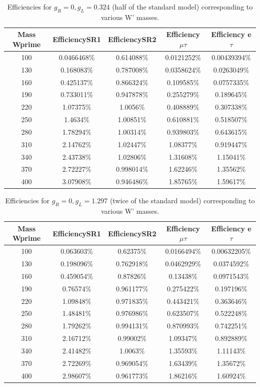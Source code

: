    \begin{table}[htb]
 	\centering
  	\begin{tabular}{|ccccc|}
  		\hline 
  		Mass Wprime  & EfficiencySR1  & EfficiencySR2 & Efficiency $\mu$$\tau$ & Efficiency e $\tau$ \\
                \hline 
100& 0.0466468\%& 0.614088\%& 0.0121252\%& 0.00439394\%\\
130& 0.168083\%& 0.787008\%& 0.0358624\%& 0.0263049\%\\
160& 0.425137\%& 0.866324\%& 0.109585\%& 0.0757335\%\\
190& 0.733011\%& 0.947878\%& 0.255279\%& 0.189645\%\\
220& 1.07375\%& 1.0056\%& 0.408889\%& 0.307338\%\\
250& 1.4634\%& 1.00851\%& 0.610881\%& 0.518507\%\\
280& 1.78294\%& 1.00314\%& 0.939803\%& 0.643615\%\\
310& 2.14762\%& 1.02447\%& 1.08377\%& 0.919447\%\\
340& 2.43738\%& 1.02806\%& 1.31608\%& 1.15041\%\\
370& 2.72227\%& 0.998014\%& 1.62246\%& 1.35562\%\\
400& 3.07908\%& 0.946486\%& 1.85765\%& 1.59617\%\\
  	
  	\hline
  	\end{tabular}
  	\caption{Efficiencies for $ g_R=0 , g_L=0.324 $ (half of the standard model) corresponding to various W' masses. \label{eff-half} }
  \end{table}
 

 \begin{table}[htb]
 	\centering
  	\begin{tabular}{|ccccc|}
  		\hline 
  		Mass Wprime  & EfficiencySR1  & EfficiencySR2 & Efficiency $\mu$$\tau$ & Efficiency e $\tau$ \\
 \hline 
100& 0.063603\%& 0.62375\%& 0.0166494\%& 0.00632205\%\\
130& 0.198096\%& 0.762918\%& 0.0462929\%& 0.0374592\%\\
160& 0.459054\%& 0.87826\%& 0.13438\%& 0.0971543\%\\
190& 0.76574\%& 0.961177\%& 0.275422\%& 0.197196\%\\
220& 1.09848\%& 0.971835\%& 0.443421\%& 0.363646\%\\
250& 1.48481\%& 0.976986\%& 0.623507\%& 0.522248\%\\
280& 1.79262\%& 0.994131\%& 0.870993\%& 0.742251\%\\
310& 2.16712\%& 0.99002\%& 1.09347\%& 0.892889\%\\
340& 2.41482\%& 1.0063\%& 1.35593\%& 1.11143\%\\
370& 2.72269\%&0.969054\%& 1.63439\%& 1.35672\%\\
400& 2.98607\%& 0.961773\%& 1.86216\%& 1.60924\%\\
  	
  	\hline
  	\end{tabular}
  	\caption{Efficiencies for $ g_R=0 , g_L=1.297 $ (twice of the standard model) corresponding to various W' masses. \label{eff-twice} }
  \end{table}


